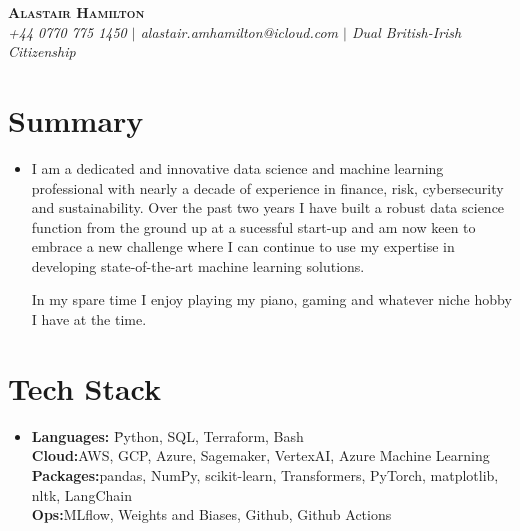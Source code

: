 \documentclass[letterpaper,11pt]{article}
\begin{document}
\vspace{-5pt}

\begin{center}
    \textbf{\Huge \scshape Alastair Hamilton} \\
    \textit{\small +44 0770 775 1450 $|$ alastair.amhamilton@icloud.com $|$ Dual British-Irish Citizenship}
    \vspace{8pt} 
\end{center}

\section{Summary}
\begin{itemize}[leftmargin=0.2in, label={}]
    \item 
        \begin{minipage}[t]{1.0\linewidth}
            I am a dedicated and innovative data science and machine learning 
            professional with nearly a decade of experience in finance, risk,
            cybersecurity and sustainability.  Over the past two years I have 
            built a robust data science function from the ground 
            up at a sucessful start-up and am now keen to embrace a new 
            challenge where I can continue to use my expertise in developing 
            state-of-the-art machine learning solutions. 

            In my spare time I enjoy
            playing my piano, gaming and whatever niche hobby I have at the time.
        \end{minipage}
\end{itemize}

\section{Tech Stack}
\begin{itemize}[leftmargin=0.2in, label={}]
    \item 
        \begin{minipage}[t]{1.0\linewidth}
            \begin{tabbing}
            \textbf{Languages:}  \=Python, SQL, Terraform, Bash \\
            \textbf{Cloud:}\>AWS, GCP, Azure, Sagemaker, VertexAI, 
            Azure Machine Learning \\
            \textbf{Packages:}\>pandas, NumPy, scikit-learn, Transformers,
            PyTorch, matplotlib, nltk, LangChain \\
            \textbf{Ops:}\>MLflow, Weights and Biases, Github, 
            Github Actions
            \end{tabbing} 
        \end{minipage}
\end{itemize}
\end{document}
